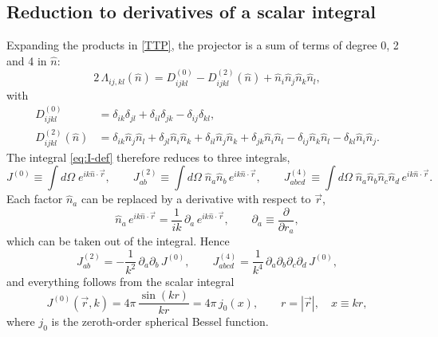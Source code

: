 \documentclass[12pt,a4paper,oneside]{article}
\numberwithin{equation}{section}   %
\begin{document}
\subsection{Reduction to derivatives of a scalar integral}
Expanding the products in \eqref{TTP}, the projector is a sum of terms of
degree 0, 2 and 4 in $\hat n$:
\begin{equation}
2\,\Lambda_{ij,kl}(\hat n)
= D^{(0)}_{ijkl}-D^{(2)}_{ijkl}(\hat n)+\hat n_i\hat n_j\hat n_k\hat n_l ,
\label{eq:Lambda-expanded}
\end{equation}
with
\begin{align}
D^{(0)}_{ijkl}&=\delta_{ik}\delta_{jl}+\delta_{il}\delta_{jk}-\delta_{ij}\delta_{kl},\\
D^{(2)}_{ijkl}(\hat n)&=\delta_{ik}\hat n_j\hat n_l+\delta_{jl}\hat n_i\hat n_k
+\delta_{il}\hat n_j\hat n_k+\delta_{jk}\hat n_i\hat n_l
-\delta_{ij}\hat n_k\hat n_l-\delta_{kl}\hat n_i\hat n_j .
\end{align}
The integral \eqref{eq:I-def} therefore reduces to three integrals,
\begin{equation}
J^{(0)} \equiv \int d\Omega\; e^{ik\hat n\cdot\vec r}, \qquad
J^{(2)}_{ab} \equiv \int d\Omega\; \hat n_a\hat n_b\, e^{ik\hat n\cdot\vec r}, \qquad
J^{(4)}_{abcd} \equiv \int d\Omega\; \hat n_a\hat n_b\hat n_c\hat n_d\,
e^{ik\hat n\cdot\vec r}.
\end{equation}
Each factor
$\hat n_a$ can be replaced by a derivative with respect to $\vec r$,
\begin{equation}
\hat n_a\, e^{ik\hat n\cdot\vec r}
= \frac{1}{ik}\,\partial_{a}\, e^{ik\hat n\cdot\vec r},
\qquad \partial_a\equiv\frac{\partial}{\partial r_a},
\end{equation}
which can be taken out of the integral. Hence
\begin{equation}
J^{(2)}_{ab}=-\frac{1}{k^{2}}\,\partial_a\partial_b\,J^{(0)},
\qquad
J^{(4)}_{abcd}=\frac{1}{k^{4}}\,\partial_a\partial_b\partial_c\partial_d\,J^{(0)},
\label{eq:J-derivatives}
\end{equation}
and everything follows from the scalar integral
\begin{equation}
J^{(0)}(\vec r,k) = 4\pi\,\frac{\sin(kr)}{kr} = 4\pi\, j_0(x),
\qquad r=|\vec r|, \quad x\equiv kr,
\label{eq:J0}
\end{equation}
where $j_0$ is the zeroth-order spherical Bessel function.
\end{document}
